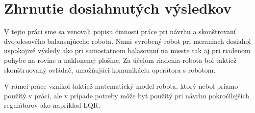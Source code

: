 \chapter{Zhrnutie dosiahnutých výsledkov}
V tejto práci sme sa venovali popisu činnosti práce pri návrhu a skonštrovaní dvojolesového balansujúceho robota. Nami vyrobený robot pri meraniach dosiahol uspokojivé výsledy ako pri samostatnom balasovaní na mieste tak aj pri riadenom pohybe na rovine a naklonenej plošine. Za účelom riadenia robota bol taktiež skonštruovaný ovládač, umožňujúci komunikáciu operátora s robotom.  

V rámci práce vznikol taktiež matematický model robota, ktorý nebol priamo použitý v práci, ale v prípade potreby môže byť použitý pri návrhu pokročilejších regulátorov ako napríklad LQR. 

